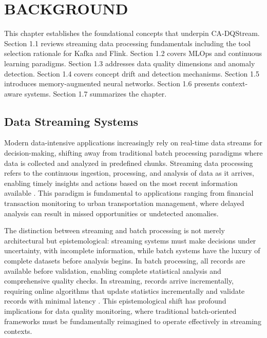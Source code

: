\chapter{BACKGROUND}

This chapter establishes the foundational concepts that underpin CA-DQStream. Section 1.1 reviews streaming data processing fundamentals including the tool selection rationale for Kafka and Flink. Section 1.2 covers MLOps and continuous learning paradigms. Section 1.3 addresses data quality dimensions and anomaly detection. Section 1.4 covers concept drift and detection mechanisms. Section 1.5 introduces memory-augmented neural networks. Section 1.6 presents context-aware systems. Section 1.7 summarizes the chapter.

\section{Data Streaming Systems}

Modern data-intensive applications increasingly rely on real-time data streams for decision-making, shifting away from traditional batch processing paradigms where data is collected and analyzed in predefined chunks. Streaming data processing refers to the continuous ingestion, processing, and analysis of data as it arrives, enabling timely insights and actions based on the most recent information available \citep{kafkaintro2024, flinkdocs2024}. This paradigm is fundamental to applications ranging from financial transaction monitoring to urban transportation management, where delayed analysis can result in missed opportunities or undetected anomalies.

The distinction between streaming and batch processing is not merely architectural but epistemological: streaming systems must make decisions under uncertainty, with incomplete information, while batch systems have the luxury of complete datasets before analysis begins. In batch processing, all records are available before validation, enabling complete statistical analysis and comprehensive quality checks. In streaming, records arrive incrementally, requiring online algorithms that update statistics incrementally and validate records with minimal latency \citep{kafkaintro2024, flinkdocs2024}. This epistemological shift has profound implications for data quality monitoring, where traditional batch-oriented frameworks must be fundamentally reimagined to operate effectively in streaming contexts.

